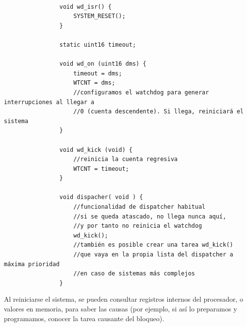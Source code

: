 \documentclass[../main.tex]{subfiles}
\begin{document}
            \begin{lstlisting}

                void wd_isr() {
                    SYSTEM_RESET();
                }

                static uint16 timeout; 
                
                void wd_on (uint16 dms) { 
                    timeout = dms; 
                    WTCNT = dms; 
                    //configuramos el watchdog para generar interrupciones al llegar a
                    //0 (cuenta descendente). Si llega, reiniciará el sistema
                } 
                
                void wd_kick (void) { 
                    //reinicia la cuenta regresiva
                    WTCNT = timeout; 
                }

                void dispacher( void ) { 
                    //funcionalidad de dispatcher habitual
                    //si se queda atascado, no llega nunca aquí,
                    //y por tanto no reinicia el watchdog
                    wd_kick(); 
                    //también es posible crear una tarea wd_kick() 
                    //que vaya en la propia lista del dispatcher a máxima prioridad
                    //en caso de sistemas más complejos
                }
            \end{lstlisting}

            Al reiniciarse el sistema, se pueden consultar registros internos del procesador, o valores en memoria, para saber las causas (por ejemplo, si así lo preparamos y programamos, conocer la tarea causante del bloqueo).
\end{document}
